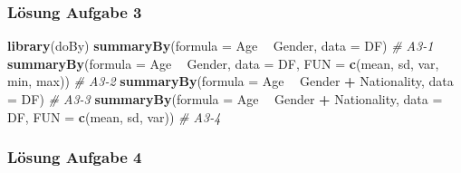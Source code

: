 \documentclass[]{article}
\newenvironment{Shaded}{\begin{snugshade}}{\end{snugshade}}
\newcommand{\KeywordTok}[1]{\textcolor[rgb]{0.13,0.29,0.53}{\textbf{#1}}}
\newcommand{\DataTypeTok}[1]{\textcolor[rgb]{0.13,0.29,0.53}{#1}}
\newcommand{\StringTok}[1]{\textcolor[rgb]{0.31,0.60,0.02}{#1}}
\newcommand{\CommentTok}[1]{\textcolor[rgb]{0.56,0.35,0.01}{\textit{#1}}}
\newcommand{\OperatorTok}[1]{\textcolor[rgb]{0.81,0.36,0.00}{\textbf{#1}}}
\newcommand{\NormalTok}[1]{#1}
\begin{document}
\subsubsection*{Lösung Aufgabe 3}\label{losung-aufgabe-3}

\begin{Shaded}
\begin{Highlighting}[]
  \KeywordTok{library}\NormalTok{(doBy)}
  \KeywordTok{summaryBy}\NormalTok{(}\DataTypeTok{formula =}\NormalTok{ Age }\OperatorTok{~}\StringTok{ }\NormalTok{Gender, }
            \DataTypeTok{data    =}\NormalTok{ DF) }\CommentTok{# A3-1}
  \KeywordTok{summaryBy}\NormalTok{(}\DataTypeTok{formula =}\NormalTok{ Age }\OperatorTok{~}\StringTok{ }\NormalTok{Gender, }
            \DataTypeTok{data    =}\NormalTok{ DF, }
            \DataTypeTok{FUN     =} \KeywordTok{c}\NormalTok{(mean, sd, var, min, max)) }\CommentTok{# A3-2}
  \KeywordTok{summaryBy}\NormalTok{(}\DataTypeTok{formula =}\NormalTok{ Age }\OperatorTok{~}\StringTok{ }\NormalTok{Gender }\OperatorTok{+}\StringTok{ }\NormalTok{Nationality, }
            \DataTypeTok{data    =}\NormalTok{ DF) }\CommentTok{# A3-3}
  \KeywordTok{summaryBy}\NormalTok{(}\DataTypeTok{formula =}\NormalTok{ Age }\OperatorTok{~}\StringTok{ }\NormalTok{Gender }\OperatorTok{+}\StringTok{ }\NormalTok{Nationality, }
            \DataTypeTok{data    =}\NormalTok{ DF, }
            \DataTypeTok{FUN     =} \KeywordTok{c}\NormalTok{(mean, sd, var)) }\CommentTok{# A3-4}
\end{Highlighting}
\end{Shaded}

\subsubsection*{Lösung Aufgabe 4}\label{losung-aufgabe-4}
\end{document}
